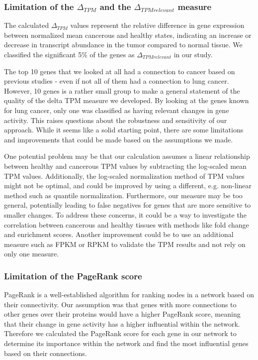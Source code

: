 \subsubsection*{Limitation of the $\Delta_{TPM}$ and the $\Delta_{TPM relevant}$ measure} \label{subsubsec:limit_delta_tpm}
The calculated $\Delta_{TPM}$ values represent the relative difference in gene expression between normalized mean cancerous and healthy states,
indicating an increase or decrease in transcript abundance in the tumor compared to normal tissue.
We classified the significant 5\% of the genes as $\Delta_{TPM relevant}$ in our study.

The top 10 genes that we looked at all had a connection to cancer based on previous studies
- even if not all of them had a connection to lung cancer.
However, 10 genes is a rather small group to make a general statement of the quality of the delta TPM measure we developed.
By looking at the genes known for lung cancer, only one was classified as having relevant changes in gene activity.
This raises questions about the robustness and sensitivity of our approach.
While it seems like a solid starting point, there are some limitations and improvements that could be made based on the assumptions we made.

One potential problem may be that our calculation assumes a linear relationship between healthy and cancerous TPM values
by subtracting the log-scaled mean TPM values.
Additionally, the log-scaled normalization method of TPM values might not be optimal,
and could be improved by using a different, e.g. non-linear method such as quantile normalization.
Furthermore, our measure may be too general, potentially leading to false negatives for genes that are more sensitive to smaller changes.
To address these concerns, it could be a way to investigate the correlation between cancerous and healthy tissues
with methods like fold change and enrichment scores.
Another improvement could be to use an additional measure such as FPKM or RPKM to validate the TPM results and not rely on only one measure.
\\

\subsubsection*{Limitation of the PageRank score} \label{subsubsec:limit_pagerank}
PageRank is a well-established algorithm for ranking nodes in a network based on their connectivity.
Our assumption was that genes with more connections to other genes over their proteins would have a higher PageRank score,
meaning that their change in gene activity has a higher influential within the network.
Therefore we calculated the PageRank score for each gene in our network to determine its importance within the network
and find the most influential genes based on their connections.


